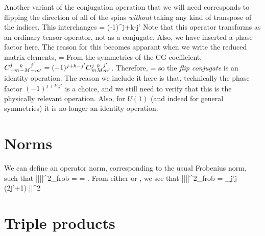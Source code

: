 \documentclass{article}[10pt]
\begin{document}
Another variant of the conjugation operation that we will need corresponds to
flipping the direction of all of the spins \emph{without} taking any kind of
transpose of the indices. This interchanges
\beq
{}
=
(-1)^{j+k-j'}
\eeq
Note that this operator transforms as an ordinary tensor operator, not as
a conjugate.
Also, we have inserted a phase factor here. The reason for this becomes apparant
when we write the reduced matrix elements,
\beq
{}
=  \; 
\eeq
From the symmetries of the CG coefficient, $\qcg{j}{k}{j'}{-m}{-M}{-m'} = 
(-1)^{j+k-j'} \qcg{j}{k}{j'}{m}{M}{m'}$. Therefore,
\beq
{} = 
\eeq
so the \textit{flip conjugate} is an identity operation. The reason we include
it here is that, technically the phase factor $(-1)^{j+k'j'}$ is a choice,
and we still need to verify that this is the physically relevant operation.
Also, for $U(1)$ (and indeed for general symmetries) it is no longer an identity operation.

\section{Norms}

We can define an operator norm, corresponding to the usual
Frobenius norm, such that
\beq
||||^2_{\mbox{\tiny frob}} = \Tr {} \cdot {} = 
\Tr {} \cdot {} \; .
\eeq
From either  or , we see that
\beq
||||^2_{\mbox{\tiny frob}} =
\sum_{j'j} (2j'+1) ||^2
\eeq

\section{Triple products}
\end{document}
